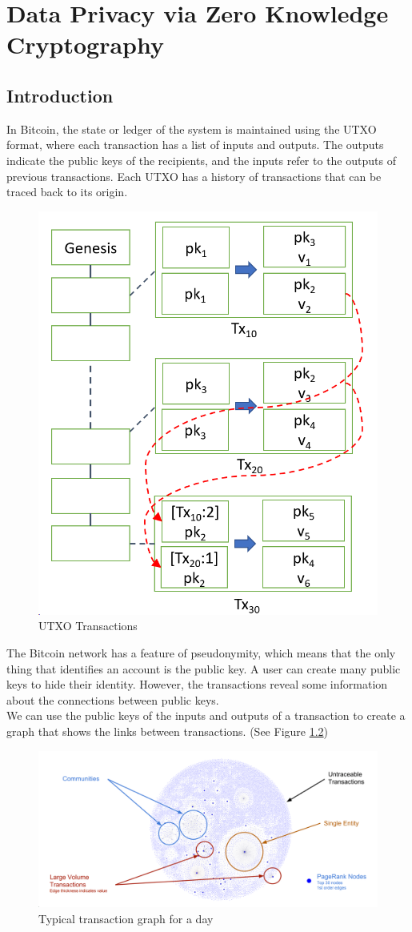 \chapter{Data Privacy via Zero Knowledge Cryptography}
\section{Introduction}
In Bitcoin, the state or ledger of the system is maintained using the UTXO format, where each transaction has a list of inputs and outputs. The outputs indicate the public keys of the recipients, and the inputs refer to the outputs of previous transactions. Each UTXO has a history of transactions that can be traced back to its origin.
\begin{figure}[h!]
	\centering
	\includegraphics[width=0.25\linewidth]{Fig/L19_F1}
	\caption{UTXO Transactions}
	\label{fig:L19_f1}
\end{figure}
The Bitcoin network has a feature of pseudonymity, which means that the only thing that identifies an account is the public key. A user can create many public keys to hide their identity. However, the transactions reveal some information about the connections between public keys.\\
We can use the public keys of the inputs and outputs of a transaction to create a graph that shows the links between transactions. (See Figure \ref{fig:L19_f2})
\begin{figure}[h!]
	\centering
	\includegraphics[width=0.8\linewidth]{Fig/L19_F2}
	\caption{Typical transaction graph for a day}
	\label{fig:L19_f2}
\end{figure}

